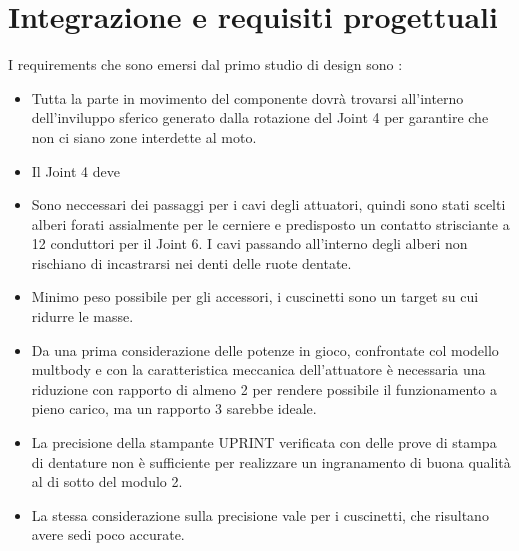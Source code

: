 \documentclass[%
corpo=11pt,
twoside,
 stile=classica,
oldstyle,
greek,%
]{toptesi}
\begin{document}
	\section{Integrazione e requisiti progettuali}
	I requirements che sono emersi dal primo studio di design sono :
	\begin{itemize}
		\item Tutta la parte in movimento del componente dovrà trovarsi all'interno dell'inviluppo sferico generato dalla rotazione del Joint 4 per garantire che non ci siano zone interdette al moto.
		\item Il Joint 4 deve 
		\item Sono neccessari dei passaggi per i cavi degli attuatori, quindi sono stati scelti alberi forati assialmente per le cerniere e predisposto un contatto strisciante a 12 conduttori per il Joint 6. I cavi passando all'interno degli alberi non rischiano di incastrarsi nei denti delle ruote dentate. 
		\item Minimo peso possibile per gli accessori, i cuscinetti sono un target su cui ridurre le masse.
		\item Da una prima considerazione delle potenze in gioco, confrontate col modello multbody e con la caratteristica meccanica dell'attuatore è necessaria una riduzione con rapporto di almeno 2 per rendere possibile il funzionamento a pieno carico, ma un rapporto 3 sarebbe ideale. 
		\item La precisione della stampante UPRINT verificata con delle prove di stampa di dentature non è sufficiente per realizzare un ingranamento di buona qualità al di sotto del modulo 2. 
		\item La stessa considerazione sulla precisione vale per i cuscinetti, che risultano avere sedi poco accurate. 
		
	\end{itemize}
	
	
\end{document}
